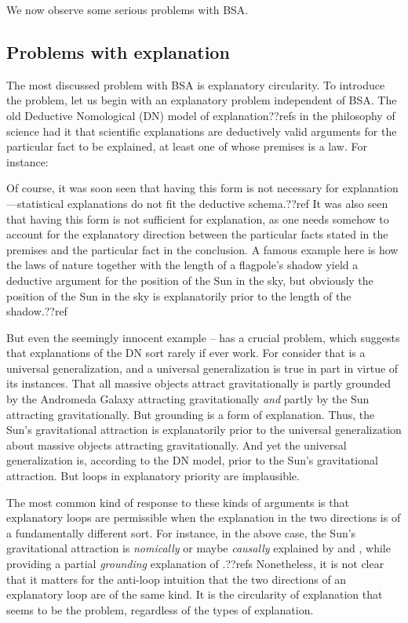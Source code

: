 We now observe some serious problems with BSA.

\subsection{Problems with explanation}\label{sec:law-explanation}
The most discussed problem with BSA is explanatory circularity. To introduce the problem, let us begin with an explanatory 
problem independent of BSA. The old Deductive Nomological (DN) model of explanation??refs in the philosophy of science had it
that scientific explanations are deductively valid arguments for the particular fact to be explained, at least one of whose premises 
is a law. For instance:

Of course, it was soon seen that having this form is not necessary for explanation---statistical explanations do not fit the
deductive schema.??ref It was also seen that having this form is not sufficient for explanation, as one needs somehow to account
for the explanatory direction between the particular facts stated in the premises and the particular fact in the conclusion.
A famous example here is how the laws of nature together with the length of a flagpole's shadow yield a deductive argument
for the position of the Sun in the sky, but obviously the position of the Sun in the sky is explanatorily prior to the length of
the shadow.??ref

But even the seemingly innocent example -- has a crucial problem, which suggests that
explanations of the DN sort rarely if ever work. For consider that  is a universal generalization, and a universal
generalization is true in part in virtue of its instances. That all massive objects attract gravitationally is partly grounded
by the Andromeda Galaxy attracting gravitationally \textit{and} partly by the Sun attracting gravitationally. But grounding is a 
form of explanation. Thus, the Sun's gravitational attraction is explanatorily prior to the universal generalization about massive
objects attracting gravitationally. And yet the universal generalization is, according to the DN model, prior to the Sun's gravitational
attraction. But loops in explanatory priority are implausible.

The most common kind of response to these kinds of arguments is that explanatory loops are permissible when the explanation in the
two directions is of a fundamentally different sort. For instance, in the above case, the Sun's gravitational attraction is 
\textit{nomically} or maybe \textit{causally} explained by  and , while providing a partial \textit{grounding} 
explanation of .??refs Nonetheless, it is not clear that it matters for the anti-loop intuition that the two directions of an 
explanatory loop are of the same kind. It is the circularity of explanation that seems to be the problem, regardless
of the types of explanation.

